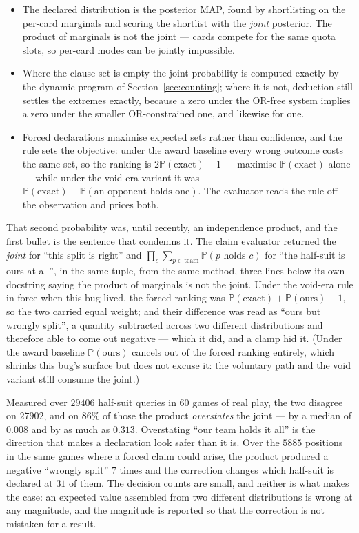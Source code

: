 \documentclass[11pt,a4paper]{article}
\newcommand{\Prob}{\ensuremath{\mathbb{P}}}
\begin{document}
\begin{itemize}
\item The declared distribution is the posterior MAP, found by shortlisting on
the per-card marginals and scoring the shortlist with the \emph{joint}
posterior. The product of marginals is not the joint --- cards compete for the
same quota slots, so per-card modes can be jointly impossible.
\item Where the clause set is empty the joint probability is computed exactly by
the dynamic program of Section~\ref{sec:counting}; where it is not, deduction
still settles the extremes exactly, because a zero under the OR-free system
implies a zero under the smaller OR-constrained one, and likewise for one.
\item Forced declarations maximise expected sets rather than confidence, and
the rule sets the objective: under the award baseline every wrong outcome
costs the same set, so the ranking is $2\Prob(\text{exact}) - 1$ ---
maximise $\Prob(\text{exact})$ alone --- while under the void-era variant it
was $\Prob(\text{exact}) - \Prob(\text{an opponent holds one})$. The
evaluator reads the rule off the observation and prices both.
\end{itemize}

That second probability was, until recently, an independence product, and the
first bullet is the sentence that condemns it. The claim evaluator returned the
\emph{joint} for ``this split is right'' and $\prod_c \sum_{p \in
\text{team}} \Prob(p \text{ holds } c)$ for ``the half-suit is ours at all'', in
the same tuple, from the same method, three lines below its own docstring
saying the product of marginals is not the joint. Under the void-era rule in
force when this bug lived, the forced ranking was $\Prob(\text{exact}) +
\Prob(\text{ours}) - 1$, so the two carried equal weight; and their
difference was read as ``ours but wrongly split'', a quantity subtracted
across two different distributions and therefore able to come out negative
--- which it did, and a clamp hid it. (Under the award baseline
$\Prob(\text{ours})$ cancels out of the forced ranking entirely, which
shrinks this bug's surface but does not excuse it: the voluntary path and
the void variant still consume the joint.)

Measured over $29406$ half-suit queries in $60$ games of real play, the two
disagree on $27902$, and on $86\%$ of those the product \emph{overstates} the
joint --- by a median of $0.008$ and by as much as $0.313$. Overstating ``our
team holds it all'' is the direction that makes a declaration look safer than
it is. Over the $5885$ positions in the same games where a forced claim could
arise, the product produced a negative ``wrongly split'' $7$ times and the
correction changes which half-suit is declared at $31$ of them. The decision
counts are small, and neither is what makes the case: an expected value
assembled from two different distributions is wrong at any magnitude, and the
magnitude is reported so that the correction is not mistaken for a result.
\end{document}
